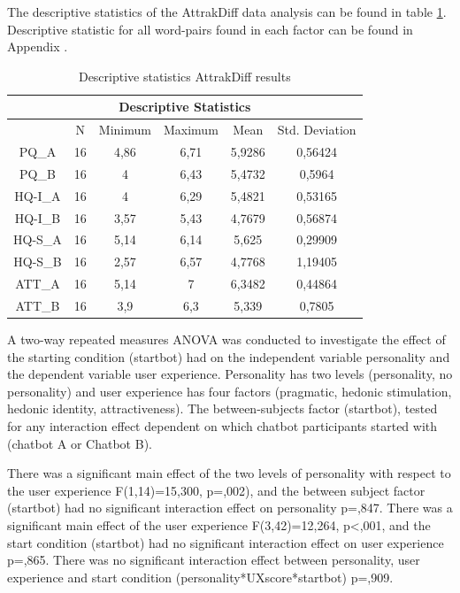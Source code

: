 The descriptive statistics of the AttrakDiff data analysis can be found in table \ref{table:6}. Descriptive statistic for all word-pairs found in each factor can be found in Appendix .

\begin{table}[h]
\centering
\begin{tabular}{cccccc}
\hline
\multicolumn{6}{c}{\textbf{Descriptive Statistics}} \\
\hline
& N & Minimum & Maximum & Mean & Std. Deviation \\
PQ_A & 16 & 4,86 & 6,71 & 5,9286 & 0,56424 \\
PQ_B & 16 & 4 & 6,43 & 5,4732 & 0,5964 \\
HQ-I_A & 16 & 4 & 6,29 & 5,4821 & 0,53165 \\
HQ-I_B & 16 & 3,57 & 5,43 & 4,7679 & 0,56874 \\
HQ-S_A & 16 & 5,14 & 6,14 & 5,625 & 0,29909 \\
HQ-S_B & 16 & 2,57 & 6,57 & 4,7768 & 1,19405 \\
ATT_A & 16 & 5,14 & 7 & 6,3482 & 0,44864 \\
ATT_B & 16 & 3,9 & 6,3 & 5,339 & 0,7805 \\
\end{tabular}
\caption{Descriptive statistics AttrakDiff results}
 \label{table:6}
    \end{table}

A two-way repeated measures ANOVA was conducted to investigate the effect of the starting condition (startbot) had on the independent variable personality and the dependent variable user experience. Personality has two levels (personality, no personality) and user experience has four factors (pragmatic, hedonic stimulation, hedonic identity, attractiveness). The between-subjects factor (startbot), tested for any interaction effect dependent on which chatbot participants started with (chatbot A or Chatbot B).  

There was a significant main effect of the two levels of personality with respect to the user experience F(1,14)=15,300, p=,002), and the between subject factor (startbot) had no significant interaction effect on personality p=,847. There was a significant main effect of the user experience F(3,42)=12,264, p<,001, and the start condition (startbot) had no significant interaction effect on user experience p=,865. There was no significant interaction effect between personality, user experience and start condition (personality*UXscore*startbot) p=,909.

